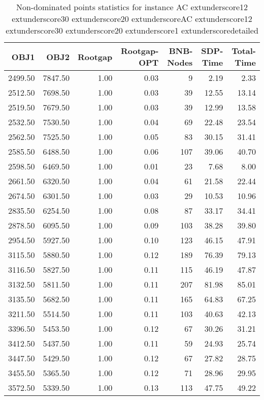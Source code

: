 \begin{table}
\caption{Non-dominated points statistics for instance AC	extunderscore12	extunderscore30	extunderscore20	extunderscoreAC	extunderscore12	extunderscore30	extunderscore20	extunderscore1	extunderscoredetailed}
\label{tab:stats/AC_12_30_20_AC_12_30_20_1_detailed}
\begin{tabular}{rrrrrrr}
\toprule
OBJ1 & OBJ2 & Rootgap & Rootgap-OPT & BNB-Nodes & SDP-Time & Total-Time \\
\midrule
2499.50 & 7847.50 & 1.00 & 0.03 & 9 & 2.19 & 2.33 \\
2512.50 & 7698.50 & 1.00 & 0.03 & 39 & 12.55 & 13.14 \\
2519.50 & 7679.50 & 1.00 & 0.03 & 39 & 12.99 & 13.58 \\
2532.50 & 7530.50 & 1.00 & 0.04 & 69 & 22.48 & 23.54 \\
2562.50 & 7525.50 & 1.00 & 0.05 & 83 & 30.15 & 31.41 \\
2585.50 & 6488.50 & 1.00 & 0.06 & 107 & 39.06 & 40.70 \\
2598.50 & 6469.50 & 1.00 & 0.01 & 23 & 7.68 & 8.00 \\
2661.50 & 6320.50 & 1.00 & 0.04 & 61 & 21.58 & 22.44 \\
2674.50 & 6301.50 & 1.00 & 0.03 & 29 & 10.53 & 10.96 \\
2835.50 & 6254.50 & 1.00 & 0.08 & 87 & 33.17 & 34.41 \\
2878.50 & 6095.50 & 1.00 & 0.09 & 103 & 38.28 & 39.80 \\
2954.50 & 5927.50 & 1.00 & 0.10 & 123 & 46.15 & 47.91 \\
3115.50 & 5880.50 & 1.00 & 0.12 & 189 & 76.39 & 79.13 \\
3116.50 & 5827.50 & 1.00 & 0.11 & 115 & 46.19 & 47.87 \\
3132.50 & 5811.50 & 1.00 & 0.11 & 207 & 81.98 & 85.01 \\
3135.50 & 5682.50 & 1.00 & 0.11 & 165 & 64.83 & 67.25 \\
3211.50 & 5514.50 & 1.00 & 0.11 & 103 & 40.63 & 42.13 \\
3396.50 & 5453.50 & 1.00 & 0.12 & 67 & 30.26 & 31.21 \\
3412.50 & 5437.50 & 1.00 & 0.11 & 59 & 24.93 & 25.74 \\
3447.50 & 5429.50 & 1.00 & 0.12 & 67 & 27.82 & 28.75 \\
3455.50 & 5365.50 & 1.00 & 0.12 & 71 & 28.96 & 29.95 \\
3572.50 & 5339.50 & 1.00 & 0.13 & 113 & 47.75 & 49.22 \\

\end{tabular}
\end{table}
